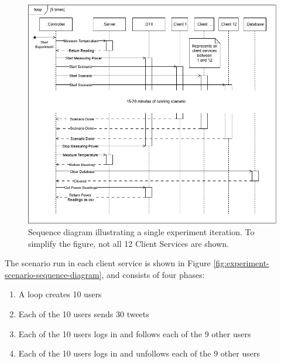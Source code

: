\documentclass[main.tex]{subfiles}
\begin{document}
\begin{figure}[!htbp]
    \centering
    \includegraphics[width=\linewidth]{media/experiment/experiment-run.png}
    \caption{Sequence diagram illustrating a single experiment iteration. To simplify the figure, not all 12 Client Services are shown.}
    \label{fig:experiment-run-scenario-sequence-diagram}
\end{figure}

The scenario run in each client service is shown in Figure \ref{fig:experiment-scenario-sequence-diagram}, and consists of four phases:

\begin{enumerate}
    \item A loop creates 10 users
    \item Each of the 10 users sends 30 tweets
    \item Each of the 10 users logs in and follows each of the 9 other users
    \item Each of the 10 users logs in and unfollows each of the 9 other users
\end{enumerate}
\end{document}
